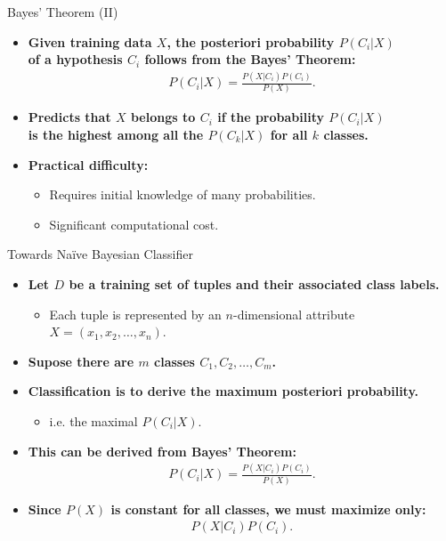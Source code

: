 \begin{frame}{Bayes' Theorem (II)}
  \begin{itemize}
  \item \textbf{Given training data $X$, the posteriori probability $P(C_i|X)$\\
      of a hypothesis $C_i$ follows from the Bayes' Theorem:}
    \begin{align}
      P(C_i|X) = \frac{P(X|C_i)P(C_i)}{P(X)}.
    \end{align}
  \item \textbf{Predicts that $X$ belongs to $C_i$ if the probability $P(C_i|X)$\\
      is {\color{airforceblue}the highest} among all the $P(C_k|X)$ for all $k$ classes.}
  \item \textbf{Practical difficulty:}
    \begin{itemize}
    \item Requires initial knowledge of many probabilities.
    \item Significant computational cost.
    \end{itemize}
  \end{itemize}
\end{frame}

\begin{frame}{Towards Naïve Bayesian Classifier}
  \begin{itemize}
  \item \textbf{Let $D$ be a training set of tuples and their associated class labels.}
    \begin{itemize}
    \item Each tuple is represented by an $n$-dimensional attribute $X = (x_1,x_2,\ldots,x_n)$.
    \end{itemize}
  \item \textbf{Supose there are $m$ classes $C_1,C_2, \ldots, C_m$.}
  \item \textbf{Classification is to derive the {\color{airforceblue}maximum posteriori probability}.}
    \begin{itemize}
    \item i.e. the maximal $P(C_i|X)$.
    \end{itemize}
  \item \textbf{This can be derived from Bayes' Theorem:}
    \begin{align}
      P(C_i|X) = \frac{P(X|C_i)P(C_i)}{P(X)}.
    \end{align}
  \item \textbf{Since $P(X)$ is constant for all classes, we must maximize only:}
    \begin{align}
      P(X|C_i)P(C_i).
    \end{align}
  \end{itemize}
\end{frame}

